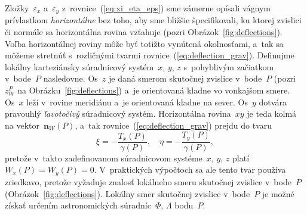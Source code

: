 \documentclass[a4paper, 12pt]{book}
\let\vec\mathbf
\begin{document}
Zložky~$\varepsilon_x$ a~$\varepsilon_y$ z~rovnice~(\ref{eq:xi_eta_eps}) sme 
zámerne opísali vágnym prívlastkom \emph{horizontálne} bez toho, aby sme 
bližšie špecifikovali, ku ktorej zvislici či normále sa horizontálna rovina 
vzťahuje (pozri Obrázok~\ref{fig:deflections}).  Voľba horizontálnej roviny 
môže byť totižto vynútená okolnosťami, a~tak sa môžeme stretnúť s~rozličnými 
tvarmi rovnice~(\ref{eq:deflection_grav}).  Definujme lokálny karteziánsky 
súradnicový systém~$x$, $y$, $z$ s~pohyblivým začiatkom v~bode~$P$ nasledovne.  
Os~$z$ je daná smerom skutočnej zvislice v~bode~$P$ (pozri~$z_W^P$ na 
Obrázku~\ref{fig:deflections}) a~je orientovaná kladne vo vonkajšom smere.  
Os~$x$ leží v~rovine meridiánu a~je orientovaná kladne na sever.  Os~$y$ 
dotvára pravouhlý \emph{ľavotočivý} súradnicový systém.  Horizontálna 
rovina~$xy$ je teda kolmá na vektor~$\vec n_W(P)$, a~tak 
rovnice~(\ref{eq:deflection_grav}) prejdu do tvaru \parencite{Borre_chapter4}
%
\begin{equation}
\label{eq:deflection_grav_nat}
\xi = -\frac{T_x(P)}{\gamma(P)}{,} \quad \eta = -\frac{T_y(P)}{\gamma(P)}{,}
\end{equation}
%
pretože v~takto zadefinovanom súradnicovom systéme~$x$, $y$, $z$ platí $W_x(P) 
= W_y(P) = 0$.  V~praktických výpočtoch sa ale tento tvar používa zriedkavo, 
pretože vyžaduje znalosť lokálneho smeru skutočnej zvislice v~bode~$P$ 
(Obrázok~\ref{fig:deflections}).  Lokálny smer skutočnej zvislice v~bode~$P$ je 
možné získať určením astronomických súradníc~$\Phi$, $\Lambda$ bodu~$P$.
\end{document}
